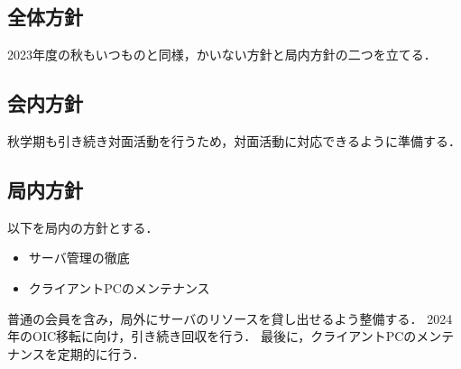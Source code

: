 \subsection*{全体方針}


2023年度の秋もいつものと同様，かいない方針と局内方針の二つを立てる．

\subsection*{会内方針}
秋学期も引き続き対面活動を行うため，対面活動に対応できるように準備する．

\subsection*{局内方針}
以下を局内の方針とする．
\begin{itemize}
    \item サーバ管理の徹底
    \item クライアントPCのメンテナンス
\end{itemize}
普通の会員を含み，局外にサーバのリソースを貸し出せるよう整備する．
2024年のOIC移転に向け，引き続き回収を行う．
最後に，クライアントPCのメンテナンスを定期的に行う．
